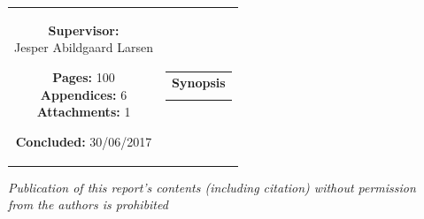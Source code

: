 \begin{nopagebreak}
{\begin{tabular}{cc}
{{\textbf{Supervisor:}\\Jesper Abildgaard Larsen\\
}

\textbf{Pages:} 100\\
\textbf{Appendices:} 6 \\
\textbf{Attachments:} 1 \\

\textbf{Concluded:} 30/06/2017\\

\vfill } &
\parbox{7cm}{
  \vspace{.15cm}
  \hfill
  \begin{tabular}{l}
  {\textbf{Synopsis}}\bigskip \\
  \fbox{
    \parbox{6.5cm}{\bigskip
     {\vfill{\small 
     \bigskip}}
     }}
   \end{tabular}}
\end{tabular} %
}


\textit{\phantom{A}Publication of this report's contents (including citation) without permission\\ \phantom{A}from the authors is prohibited}\\

\end{nopagebreak}
%
